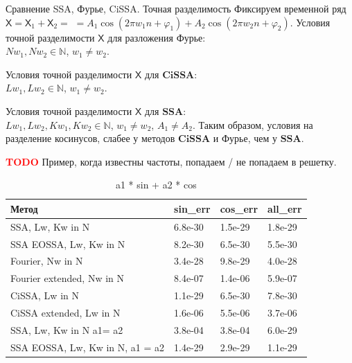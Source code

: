 \documentclass[notheorems, handout]{beamer}
\newcommand{\SSA}{\textbf{SSA}}
\newcommand{\CISSA}{\textbf{CiSSA}}
\newcommand{\TS}{\mathsf{X}}
\begin{document}
		
	
	\begin{frame}{Сравнение SSA, Фурье, CiSSA. Точная разделимость}
		Фиксируем временной ряд $\TS = \TS_{1} + \TS_{2} =$ $= A_1 \cos(2\pi w_1 n + \varphi_1) + A_2 \cos(2\pi w_2 n + \varphi_2)$.
		\newline \newline
		Условия точной разделимости $\TS$ для разложения Фурье: \\
		$Nw_1, Nw_2 \in \mathbb{N}$, $w_1 \not = w_2$.
		
		Условия точной разделимости $\TS$ для $\CISSA$: \\
		$Lw_1, Lw_2 \in \mathbb{N}$, $w_1 \not = w_2$.
		
		Условия точной разделимости $\TS$ для $\SSA$: \\
		$Lw_1, Lw_2, Kw_1, Kw_2 \in \mathbb{N}$, $w_1 \not = w_2$, $A_1 \not = A_2$.
		\newline \newline
		Таким образом, условия на разделение косинусов, слабее у методов $\CISSA$ и Фурье, чем у $\SSA$.
	\end{frame}
	
	\begin{frame}
		\textcolor{red}{\textbf{TODO}} 
		Пример, когда известны частоты, попадаем / не попадаем в решетку.
		\begin{table}[ht]
			\centering
			\begin{tabular}{llll}
			  \hline
			Метод & sin\_err & cos\_err & all\_err \\ 
			  \hline
			SSA, 
			Lw, Kw in N & 6.8e-30 & 1.5e-29 & 1.8e-29 \\ 
			  SSA EOSSA, 
			Lw, Kw in N & 8.2e-30 & 6.5e-30 & 5.5e-30 \\ 
			  Fourier, Nw in N & 3.4e-28 & 9.8e-29 & 4.0e-28 \\ 
			  Fourier extended, Nw in N & 8.4e-07 & 1.4e-06 & 5.9e-07 \\ 
			  CiSSA, Lw in N & 1.1e-29 & 6.5e-30 & 7.8e-30 \\ 
			  CiSSA extended, Lw in N & 1.6e-06 & 5.5e-06 & 3.7e-06 \\ 
			  \hline
			  SSA, Lw, Kw in N a1= a2 & 3.8e-04 & 3.8e-04 & 6.0e-29 \\ 
				SSA EOSSA, Lw, Kw in N, a1 = a2 & 1.4e-29 & 2.9e-29 & 1.1e-29 \\ 
			   \hline
			\end{tabular}
			\caption{a1 * sin + a2 * cos} 
			\end{table}
	\end{frame}
	
\end{document}
